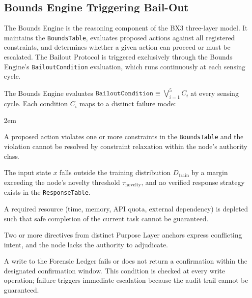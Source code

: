 \subsection{Bounds Engine Triggering Bail-Out}
\label{sec:bounds-trigger}

The Bounds Engine is the reasoning component of the BX3 three-layer model. It
maintains the \texttt{BoundsTable}, evaluates proposed actions against all registered
constraints, and determines whether a given action can proceed or must be escalated.
The Bailout Protocol is triggered exclusively through the Bounds Engine's
\texttt{BailoutCondition} evaluation, which runs continuously at each sensing cycle.

The Bounds Engine evaluates
$\texttt{BailoutCondition} \equiv \bigvee_{i=1}^{5} C_i$ at every sensing cycle.
Each condition $C_i$ maps to a distinct failure mode:

\begin{trivlist}\itemindent2em
\item[\textbf{$C_1$ — ConstraintViolation}] A proposed action violates one or more
  constraints in the \texttt{BoundsTable} and the violation cannot be resolved by
  constraint relaxation within the node's authority class.

\item[\textbf{$C_2$ — NovelInput}] The input state $x$ falls outside the training
  distribution $D_{\mathrm{train}}$ by a margin exceeding the node's novelty threshold
  $\tau_{\mathrm{novelty}}$, and no verified response strategy exists in the
  \texttt{ResponseTable}.

\item[\textbf{$C_3$ — ResourceExhaustion}] A required resource (time, memory, API
  quota, external dependency) is depleted such that safe completion of the current
  task cannot be guaranteed.

\item[\textbf{$C_4$ — HumanDirectiveConflict}] Two or more directives from distinct
  Purpose Layer anchors express conflicting intent, and the node lacks the authority
  to adjudicate.

\item[\textbf{$C_5$ — ForensicLedgerFailure}] A write to the Forensic Ledger fails
  or does not return a confirmation within the designated confirmation window. This
  condition is checked at every write operation; failure triggers immediate
  escalation because the audit trail cannot be guaranteed.
\end{trivlist}

